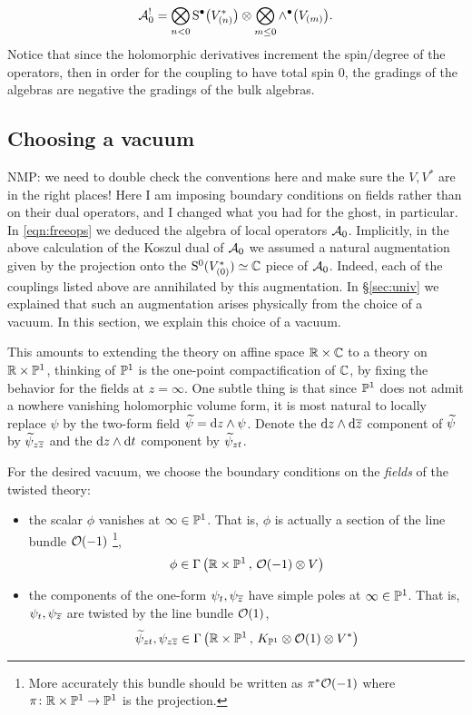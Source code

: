 \documentclass[11pt]{amsart}
\def\natalie#1{{\textcolor{green!65!black}{NMP: {#1}}}}
\begin{document}
\begin{equation}\label{eq:freedual}
\mathcal{A}_0^{!} = \bigotimes_{n < 0} {\rm S}^\bullet \big(V^*_{(n)}\big) \otimes \bigotimes_{m \leq 0} \wedge^\bullet \big(V_{(m)}\big).
\end{equation} Notice that since the holomorphic derivatives increment the spin/degree of the operators, then in order for the coupling to have total spin 0, the gradings of the algebras are negative the gradings of the bulk algebras.


\subsection{Choosing a vacuum} 
\natalie{we need to double check the conventions here and make sure the $V, V^*$ are in the right places! Here I am imposing boundary conditions on fields rather than on their dual operators, and I changed what you had for the ghost, in particular.}
In \eqref{eqn:freeops} we deduced the algebra of local operators $\mathcal A_0$. 
Implicitly, in the above calculation of the Koszul dual of $\mathcal A_0$ we assumed a natural augmentation given by the projection onto the ${\rm S}^0(V^*_{(0)})\simeq \mathbb C$ piece of $\mathcal A_0$. 
Indeed, each of the couplings listed above are annihilated by this augmentation. 
In \S \ref{sec:univ} we explained that such an augmentation arises physically from the choice of a vacuum. 
In this section, we explain this choice of a vacuum. 

This amounts to extending the theory on affine space $\mathbb R \times \mathbb C$ to a theory on $\mathbb R \times \mathbb P^1$, thinking of $\mathbb P^1$ is the one-point compactification of $\mathbb C$, by fixing the behavior for the fields at $z = \infty$. 
One subtle thing is that since $\mathbb P^1$ does not admit a nowhere vanishing holomorphic volume form, it is most natural to locally replace $\psi$ by the two-form field $\widetilde \psi = {\rm d} z \wedge \psi$.
Denote the ${\rm d} z  \wedge {\rm d} {\overline{z}}$ component of $\widetilde \psi$ by $\widetilde \psi_{z {\overline{z}}}$ and the ${\rm d} z  \wedge {\rm d} t$ component by $\widetilde \psi_{zt}$. 

For the desired vacuum, we choose the boundary conditions on the \textit{fields} of the twisted theory:
\begin{itemize}
\item the scalar $\phi$ vanishes at $\infty \in \mathbb P^1$. 
That is, $\phi$ is actually a section of the line bundle $\mathcal O(-1)$ \footnote{More accurately this bundle should be written as $\pi^* \mathcal O(-1)$ where $\pi \colon \mathbb R \times \mathbb P^1 \to \mathbb P^1$ is the projection.}, 
\[
\phi \in \Gamma \left(\mathbb R \times \mathbb P^1 \, , \, \mathcal O(-1) \otimes V \right) 
\]
\item the components of the one-form $\psi_{t}, \psi_{{\overline{z}}}$ have simple poles at $\infty \in \mathbb P^1$.
That is, $\psi_t,\psi_{{\overline{z}}}$ are twisted by the line bundle $\mathcal O(1)$,
\[
\widetilde \psi_{zt}, \psi_{z{\overline{z}}}\in \Gamma\left(\mathbb R \times \mathbb P^1 \, , \, K_{\mathbb P^1} \otimes \mathcal O(1) \otimes V^*\right)
\]
\end{itemize}
\end{document}
